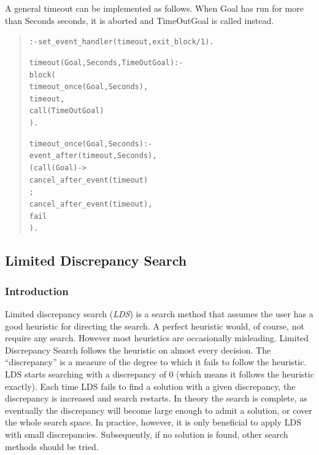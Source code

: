 A general timeout can be implemented as follows. When Goal has run for
more than Seconds seconds, it is aborted and TimeOutGoal is called instead.
\begin{quote}\begin{alltt}
:- set_event_handler(timeout, exit_block/1).

timeout(Goal, Seconds, TimeOutGoal) :-
        block(
            timeout_once(Goal, Seconds),
            timeout,
            call(TimeOutGoal)
        ).

    timeout_once(Goal, Seconds) :-
        event_after(timeout, Seconds),
        ( call(Goal) ->
            cancel_after_event(timeout)
        ;
            cancel_after_event(timeout),
            fail
        ).
\end{alltt}\end{quote}


\subsection{Limited Discrepancy Search}

\subsubsection{Introduction}

Limited discrepancy search ({\em LDS}) is a search method that assumes
the user has a good heuristic for directing the search.  A perfect
heuristic would, of course, not require any search.  However most
heuristics are occasionally misleading.  Limited Discrepancy Search
follows the heuristic on almost every decision.  The
``discrepancy'' is a measure of the degree to which it fails to follow
the heuristic.  LDS starts searching with a discrepancy of $0$ (which
means it follows the heuristic exactly).  Each time LDS fails to find
a solution with a given discrepancy, the discrepancy is increased and
search restarts.  In theory the search is complete, as eventually the
discrepancy will become large enough to admit a solution, or cover
the whole search space.  In practice, however, it is only beneficial
to apply LDS with small discrepancies.  Subsequently, if no solution
is found, other search methods should be tried.

